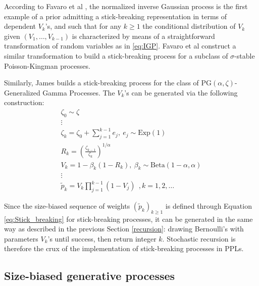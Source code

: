 According to Favaro et al \cite{Favaro:2014bo}, the normalized inverse Gaussian process \cite{Favaro:2012ht} is the first example of a prior admitting a stick-breaking representation in terms of dependent  $V_k$'s, and such that for any $k \ge 1$ the conditional distribution of $V_k$ given $(V_1,\dots,V_{k-1})$ is characterized by means of a straightforward transformation of random variables as in \ref{eq:IGP}.
Favaro et al \cite{Favaro:2014bo} construct a similar transformation to build a stick-breaking process for a subclass of $\sigma$-stable Poisson-Kingman processes.

Similarly, James \cite{James:2013uk} builds a stick-breaking process for the class of $\text{PG}(\alpha,\zeta)$-Generalized Gamma Processes. The $V_k$'s can be generated via the following construction:
\begin{gather*}
\zeta_0 \sim \zeta \\
\vdots \\
\zeta_k = \zeta_0 + \sum_{j=1}^{k-1}{e_j},\ e_j \sim \text{Exp}(1) \\
R_k = \left(\frac{\zeta_{k-1}}{\zeta_k}\right)^{1/\alpha} \\
V_k = 1 - \beta_k(1 - R_k), \ \beta_k \sim \text{Beta}(1-\alpha,\alpha) \\
\vdots \\
\tilde{p}_k = V_k \prod_{j=1}^{k-1}(1-V_j) \ \ ,k= 1,2,\dots
\end{gather*}

Since the size-biased sequence of weights $(\tilde{p}_k)_{k \ge 1}$ is defined through Equation \ref{eq:Stick_breaking} for stick-breaking processes, it can be generated in the same way as described in the previous Section \ref{recursion}: drawing Bernoulli's with parameters $V_k$'s until success, then return integer $k$. Stochastic recursion is therefore the crux of the  implementation of stick-breaking processes in \glspl{PPL}.

\subsection{Size-biased generative processes}

